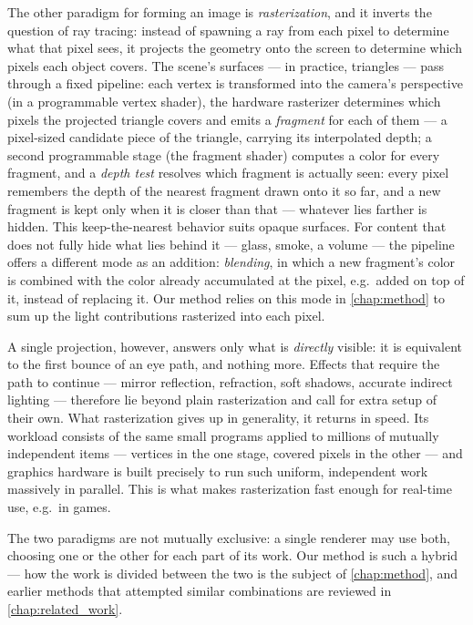 The other paradigm for forming an image is \emph{rasterization}, and it inverts the question of ray tracing: instead of spawning a ray from each pixel to determine what that pixel sees, it projects the geometry onto the screen to determine which pixels each object covers. The scene's surfaces --- in practice, triangles --- pass through a fixed pipeline: each vertex is transformed into the camera's perspective (in a programmable vertex shader), the hardware rasterizer determines which pixels the projected triangle covers and emits a \emph{fragment} for each of them --- a pixel-sized candidate piece of the triangle, carrying its interpolated depth; a second programmable stage (the fragment shader) computes a color for every fragment, and a \emph{depth test} resolves which fragment is actually seen: every pixel remembers the depth of the nearest fragment drawn onto it so far, and a new fragment is kept only when it is closer than that --- whatever lies farther is hidden. This keep-the-nearest behavior suits opaque surfaces. For content that does not fully hide what lies behind it --- glass, smoke, a volume --- the pipeline offers a different mode as an addition: \emph{blending}, in which a new fragment's color is combined with the color already accumulated at the pixel, e.g.\ added on top of it, instead of replacing it. Our method relies on this mode in \cref{chap:method} to sum up the light contributions rasterized into each pixel.

A single projection, however, answers only what is \emph{directly} visible: it is equivalent to the first bounce of an eye path, and nothing more. Effects that require the path to continue --- mirror reflection, refraction, soft shadows, accurate indirect lighting --- therefore lie beyond plain rasterization and call for extra setup of their own. What rasterization gives up in generality, it returns in speed. Its workload consists of the same small programs applied to millions of mutually independent items --- vertices in the one stage, covered pixels in the other --- and graphics hardware is built precisely to run such uniform, independent work massively in parallel. This is what makes rasterization fast enough for real-time use, e.g.\ in games.

The two paradigms are not mutually exclusive: a single renderer may use both, choosing one or the other for each part of its work. Our method is such a hybrid --- how the work is divided between the two is the subject of \cref{chap:method}, and earlier methods that attempted similar combinations are reviewed in \cref{chap:related_work}. 